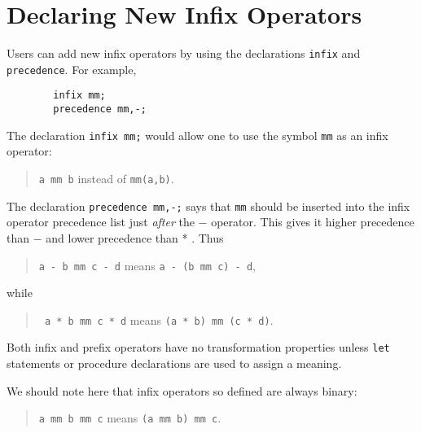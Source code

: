 \section{Declaring New Infix Operators}
\hypertarget{command:INFIX}{}
\hypertarget{command:PRECEDENCE}{}

Users can add new infix operators by using the declarations
\texttt{infix} and \texttt{precedence}.
For example,
\begin{verbatim}
        infix mm;
        precedence mm,-;
\end{verbatim}
The declaration \texttt{infix mm;} would allow one to use the symbol
\texttt{mm} as an infix operator:
\begin{quote}
\hspace{0.2in} \texttt{a mm b} \hspace{0.3in} instead of \hspace{0.3in}
\texttt{mm(a,b)}.
\end{quote}

The declaration \texttt{precedence mm,-;} says that \texttt{mm} should be
inserted into the infix operator precedence list just {\em after\/}
the $-$ operator.  This gives it higher precedence than $-$ and lower
precedence than * .  Thus

\begin{quote}
\hspace{0.2in}\texttt{a - b mm c - d}\hspace{.3in} means \hspace{.3in}
\texttt{a - (b mm c) - d},
\end{quote}
while
\begin{quote}
\hspace{0.2in}\texttt{  a * b mm c * d}\hspace{.3in} means \hspace{.3in}
\texttt{(a * b) mm (c * d)}.
\end{quote}

Both infix and prefix operators have no transformation
properties unless \texttt{let} statements or procedure
declarations are used to assign a meaning.

We should note here that infix operators so defined are always binary:
\begin{quote}
\hspace{0.2in}\texttt{a mm b mm c}\hspace{.3in} means \hspace{.3in}
\texttt{(a mm b) mm c}.
\end{quote}

